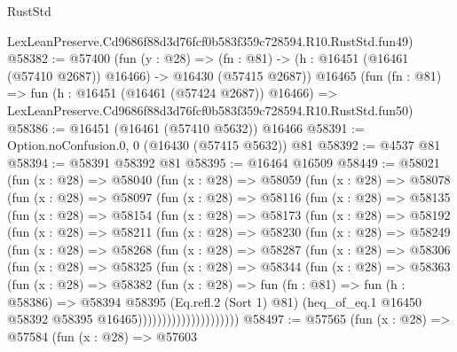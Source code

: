 \begin{lexlean}{RustStd}
\begin{coremodule}
    LexLeanPreserve.Cd9686f88d3d76fcf0b583f359c728594.R10.RustStd.fun49)
@58382 := @57400
    (fun (y : @28) =>
    (fn : @81) -> (h : @16451 (@16461 (@57410 @2687)) @16466) -> @16430 (@57415 @2687))
    @16465
    (fun (fn : @81) =>
    fun (h : @16451 (@16461 (@57424 @2687)) @16466) =>
    LexLeanPreserve.Cd9686f88d3d76fcf0b583f359c728594.R10.RustStd.fun50)
@58386 := @16451 (@16461 (@57410 @5632)) @16466
@58391 := Option.noConfusion.{0, 0} (@16430 (@57415 @5632)) @81
@58392 := @4537 @81
@58394 := @58391 @58392 @81
@58395 := @16464 @16509
@58449 := @58021
    (fun (x : @28) =>
    @58040
      (fun (x : @28) =>
      @58059
        (fun (x : @28) =>
        @58078
          (fun (x : @28) =>
          @58097
            (fun (x : @28) =>
            @58116
              (fun (x : @28) =>
              @58135
                (fun (x : @28) =>
                @58154
                  (fun (x : @28) =>
                  @58173
                    (fun (x : @28) =>
                    @58192
                      (fun (x : @28) =>
                      @58211
                        (fun (x : @28) =>
                        @58230
                          (fun (x : @28) =>
                          @58249
                            (fun (x : @28) =>
                            @58268
                              (fun (x : @28) =>
                              @58287
                                (fun (x : @28) =>
                                @58306
                                  (fun (x : @28) =>
                                  @58325
                                    (fun (x : @28) =>
                                    @58344
                                      (fun (x : @28) =>
                                      @58363
                                        (fun (x : @28) =>
                                        @58382
                                          (fun (x : @28) =>
                                          fun (fn : @81) =>
                                          fun (h : @58386) =>
                                          @58394
                                            @58395
                                            (Eq.refl.{2} (Sort 1) @81)
                                            (heq_of_eq.{1}
                                              @16450
                                              @58392
                                              @58395
                                              @16465)))))))))))))))))))))
@58497 := @57565
    (fun (x : @28) =>
    @57584
      (fun (x : @28) =>
      @57603

\end{coremodule}
\end{lexlean}
